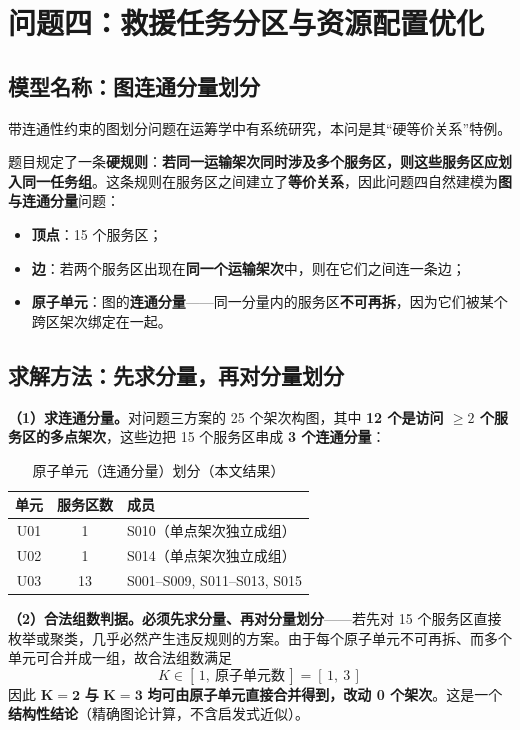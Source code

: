 \section{问题四：救援任务分区与资源配置优化}\label{sec:q4}

\subsection{模型名称：图连通分量划分}

带连通性约束的图划分问题在运筹学中有系统研究\cite{lari2015connectedpartition}，本问是其“硬等价关系”特例。

题目规定了一条\textbf{硬规则}：\textbf{若同一运输架次同时涉及多个服务区，则这些服务区应划入同一任务组}。这条规则在服务区之间建立了\textbf{等价关系}，因此问题四自然建模为\textbf{图与连通分量}问题：

\begin{itemize}[leftmargin=2em]
	\item \textbf{顶点}：15 个服务区；
	\item \textbf{边}：若两个服务区出现在\textbf{同一个运输架次}中，则在它们之间连一条边；
	\item \textbf{原子单元}：图的\textbf{连通分量}——同一分量内的服务区\textbf{不可再拆}，因为它们被某个跨区架次绑定在一起。
\end{itemize}

\subsection{求解方法：先求分量，再对分量划分}

\textbf{（1）求连通分量。}对问题三方案的 25 个架次构图，其中 \textbf{12 个是访问 $\ge2$ 个服务区的多点架次}，这些边把 15 个服务区串成 \textbf{3 个连通分量}：

\begin{table}[htbp]
	\caption{原子单元（连通分量）划分（本文结果）}
	\label{tab:q4units}
	\centering
	\begin{tabular}{ccp{7.4cm}}
		\toprule
		单元 & 服务区数 & 成员 \\
		\midrule
		U01 & 1  & S010（单点架次独立成组） \\
		U02 & 1  & S014（单点架次独立成组） \\
		U03 & 13 & S001--S009, S011--S013, S015 \\
		\bottomrule
	\end{tabular}
\end{table}

\textbf{（2）合法组数判据。}\textbf{必须先求分量、再对分量划分}——若先对 15 个服务区直接枚举或聚类，几乎必然产生违反规则的方案。由于每个原子单元不可再拆、而多个单元可合并成一组，故合法组数满足
\begin{equation}
	K\in[\,1,\ \text{原子单元数}\,]=[\,1,\ 3\,]
	\label{eq:krange}
\end{equation}
因此 $\mathbf{K=2}$ \textbf{与} $\mathbf{K=3}$ \textbf{均可由原子单元直接合并得到，改动 0 个架次}。这是一个\textbf{结构性结论}（精确图论计算，不含启发式近似）。


